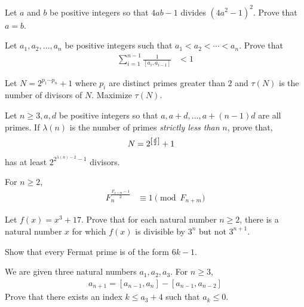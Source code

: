 \documentclass[problems.tex]{subfile}
\begin{document}
	\begin{problem}
		Let $a$ and $b$ be positive integers so that $4ab-1$ divides $(4a^2-1)^2$. Prove that $a=b$.
	\end{problem}

	\begin{problem}\label{prob:mirzakhani9}
		Let $a_1,a_2,\ldots,a_n$ be positive integers such that $a_1<a_2<\cdots < a_n$. Prove that
		\begin{align*}
			\sum_{i=1}^{n-1} \frac{1}{[a_i,a_{i-1}]} & <1
		\end{align*}
	\end{problem}

	\begin{problem}
		Let $N=2^{p_1\cdots p_n}+1$ where $p_i$ are distinct primes greater than $2$ and $\tau(N)$ is the number of divisors of $N$. Maximize $\tau(N)$.
	\end{problem}

	\begin{problem}
		Let $n\geq3,a,d$ be positive integers so that $a,a+d,\ldots,a+(n-1)d$ are all primes. If $\lambda(n)$ is the number of primes \textit{strictly less than }$n$, prove that,
			\begin{align*}
				N & = 2^{\floor{\frac{d}{2}}}+1
			\end{align*}
		has at least $2^{2^{\lambda(n)-2}-1}$ divisors.
	\end{problem}

	\begin{problem}
		For $n\geq2$,
		\begin{align*}
			F_n^{\frac{F_{n+m}-1}{2}} &\equiv1\pmod{F_{n+m}}
		\end{align*}
	\end{problem}

	\begin{problem}
		Let $f(x) = x^3 + 17$. Prove that for each natural number $n\geq 2$, there is a natural number $x$ for which $f(x)$ is divisible by $3^n$ but not $3^{n+1}$.
	\end{problem}

	\begin{problem}[Boylai]
		Show that every Fermat prime is of the form $6k-1$.
	\end{problem}

	\begin{problem}
		We are given three natural numbers $a_1,a_2,a_3$. For $n\geq3$,
			\begin{align*}
				a_{n+1} = [a_{n-1},a_n]-[a_{n-1},a_{n-2}]
			\end{align*}
		Prove that there exists an index $k\leq a_3+4$ such that $a_k\leq0$.
	\end{problem}
\end{document}
